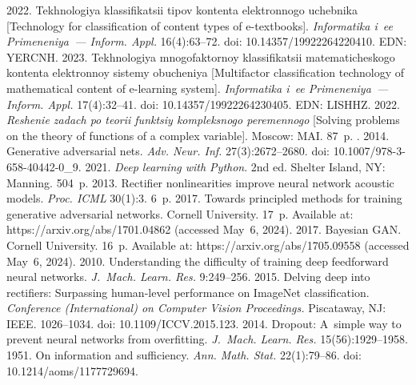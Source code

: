 \begin{multicols}{2}
{{\begin{thebibliography}{99}
 2022. Tekhnologiya klassifikatsii tipov kontenta elektronnogo 
uchebnika [Technology for classification of content types of e-textbooks]. \textit{Informatika i~ee 
Primeneniya~--- Inform. Appl.} 16(4):63--72. doi: 10.14357/19922264220410. EDN: YERCNH.
 2023. Tekhnologiya mnogofaktornoy klassifikatsii 
matematicheskogo kontenta elektronnoy sistemy obucheniya [Multifactor classification technology of 
mathematical content of e-learning system]. \textit{Informatika i~ee Primeneniya~--- Inform. Appl.} 
17(4):32--41. doi: 10.14357/19922264230405. EDN: LISHHZ.
 2022. \textit{Reshenie zadach po teorii funktsiy 
kompleksnogo peremennogo} [Solving problems on the theory of functions of a complex variable]. 
Moscow: MAI. 87~p.
. 2014. Generative adversarial nets. \textit{Adv. Neur. Inf.} 
27(3):2672--2680.  doi: 10.1007/978-3-658-40442-0\_9.
 2021. \textit{Deep learning with Python}. 2nd ed. Shelter Island, NY: Manning. 504~p.
 2013. Rectifier nonlinearities improve neural 
network acoustic models. \textit{Proc. ICML} 30(1):3. 6~p.
 2017. Towards principled methods for training generative 
adversarial networks. Cornell University. 17~p. Available at: {\sf https://arxiv.org/\linebreak abs/1701.04862} (accessed 
May~6, 2024).
 2017. Bayesian GAN. Cornell University. 16~p. Available at: {\sf 
https://arxiv.org/\linebreak abs/1705.09558} (accessed May~6, 2024).
 2010. Understanding the difficulty of training deep feedforward neural 
networks. \textit{J.~Mach. Learn. Res.} 9:249--256.
 2015. Delving deep into rectifiers: Surpassing  
human-level performance on ImageNet classification. \textit{Conference (International) on Computer 
Vision Proceedings.} Piscataway, NJ: 
IEEE. 1026--1034. doi: 10.1109/\mbox{ICCV}.2015.123.
 2014. Dropout: 
A~simple way to prevent neural networks from overfitting. \textit{J.~Mach. Learn. Res.} 
15(56):1929--1958.
 1951. On information and sufficiency. \textit{Ann. 
Math. Stat.} 22(1):79--86. doi: 10.1214/aoms/1177729694.

\end{thebibliography}

 }
 }

\end{multicols}

